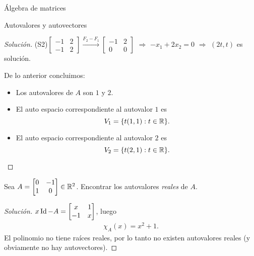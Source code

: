 \begin{chapter}{\'Algebra de matrices}
\begin{section}{Autovalores y autovectores}
\begin{proof}[Solución]
        (S2)\quad  $\begin{bmatrix}-1&2 \\ -1&2\end{bmatrix} \stackrel{F_2 -F_1}{\longrightarrow} \begin{bmatrix}-1&2 \\ 0&0\end{bmatrix}$  $\Rightarrow$ $-x_1+2x_2=0$ $\Rightarrow$ $(2t,t)$ es solución. 
    
     
    
    
     De lo anterior concluimos:
        
            \begin{itemize}
                \item Los autovalores de $A$ son $1$ y $2$.
                \item El auto espacio correspondiente al  autovalor $1$ es
            \begin{equation*}
                V_1 = \{t(1,1): t \in \mathbb R\}.
            \end{equation*}
            \item El auto espacio correspondiente al  autovalor $2$ es
            \begin{equation*}
                V_2 = \{t(2,1): t \in \mathbb R\}.
            \end{equation*}
            \end{itemize}
    
            
        \end{proof}
    

    
        \begin{ejemplo*}
        Sea $A= \begin{bmatrix}0&-1\\1&0\end{bmatrix} \in \mathbb R^2$. Encontrar los autovalores \textit{reales} de $A$.    
        \end{ejemplo*}
        \begin{proof}[Solución]
            $x \operatorname{Id}-A= \begin{bmatrix}x&1\\-1&x\end{bmatrix}$, luego
            \begin{align*}
                \chi_A(x)=x^2+1.
                \end{align*}
            El polinomio no tiene raíces reales, por lo tanto no existen autovalores reales (y obviamente no hay autovectores).
        \end{proof}


\end{section}
\end{chapter}
